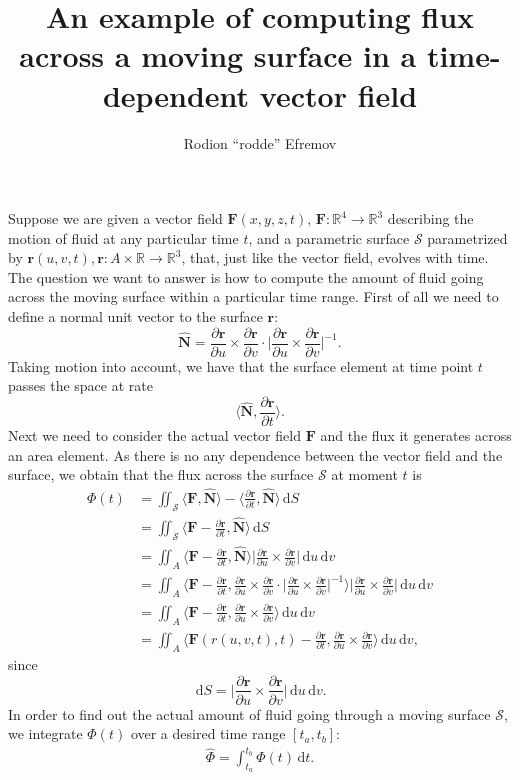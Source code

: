 \documentclass[12pt]{article}
\title{An example of computing flux across a moving surface in a time-dependent vector field}
\author{Rodion ``rodde'' Efremov}
\newcommand{\F}{\mathbf{F}}
\newcommand{\FF}{\hat{\Phi}}
\newcommand{\surf}{\mathbf{r}}
\newcommand{\N}{\hat{\mathbf{N}}}
\newcommand{\R}{\mathbb{R}}
\newcommand{\dr}{\partial \surf}
\newcommand{\du}{\partial u}
\newcommand{\dv}{\partial v}
\newcommand{\dt}{\partial t}
\newcommand{\dru}{\frac{\dr}{\du}}
\newcommand{\drv}{\frac{\dr}{\dv}}
\newcommand{\drt}{\frac{\dr}{\dt}}
\newcommand{\dS}{\,\mathrm{d}S}
\newcommand{\ddt}{\,\mathrm{d}t}
\newcommand{\ddu}{\, \mathrm{d}u}
\newcommand{\ddv}{\, \mathrm{d}v}
\begin{document}
 \maketitle

\noindent Suppose we are given a vector field $\F(x, y, z, t), \, \F \colon \R^4 \to \R^3$ describing the motion of fluid at any particular time $t$, and a parametric surface $\mathscr{S}$ parametrized by $\surf (u, v, t), \surf \colon A \times \R \to \R^3$, that, just like the vector field, evolves with time. The question we want to answer is how to compute the amount of fluid going across the moving surface within a particular time range. First of all we need to define a normal unit vector to the surface $\surf$:
\[
\N = \dru \times \drv \cdot \Bigg| \dru \times \drv \Bigg|^{-1}.
\]
Taking motion into account, we have that the surface element at time point $t$ passes the space at rate 
\[
\Big\langle \N , \drt \Big\rangle.
\]
Next we need to consider the actual vector field $\F$ and the flux it generates across an area element. As there is no any dependence between the vector field and the surface, we obtain that the flux across the surface $\mathscr{S}$ at moment $t$ is
\begin{align*}
\Phi(t) &= \iint_{\mathscr{S}} \langle \F, \N \rangle - \langle \drt, \N \rangle \dS \\
		   &= \iint_{\mathscr{S}} \langle \F - \drt, \N \rangle \dS \\
		   &= \iint_A \langle \F - \drt, \N \rangle \Bigg| \dru \times \drv \Bigg| \ddu \ddv \\ 
		   &= \iint_A \Bigg\langle \F - \drt, \dru \times \drv \cdot \Bigg| \dru \times \drv \Bigg|^{-1} \Bigg\rangle \Bigg| \dru \times \drv \Bigg| \ddu \ddv \\ 
		   &= \iint_A \Bigg\langle \F - \drt, \dru \times \drv \Bigg\rangle \ddu \ddv \\
		   &= \iint_A \Bigg\langle \F(r(u, v, t), t) - \drt, \dru \times \drv \Bigg\rangle \ddu \ddv,
\end{align*}
since
\[
\dS = \Bigg| \dru \times \drv \Bigg| \ddu \ddv.
\]
In order to find out the actual amount of fluid going through a moving surface $\mathscr{S}$, we integrate $\Phi(t)$ over a desired time range $\left[ t_a, t_b \right]$:
\begin{align*}
\FF = \int_{t_a}^{t_b} \Phi(t) \ddt.
\end{align*}
\end{document}
